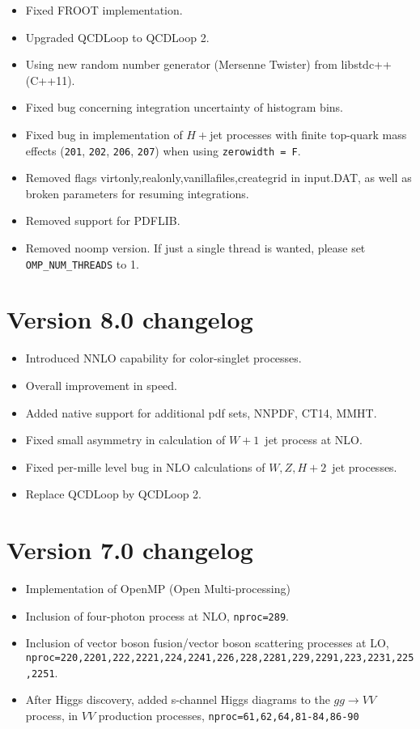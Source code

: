 \documentclass{article}
\begin{document}
{{{{{{\begin{itemize}
\item Fixed FROOT implementation.
\item Upgraded QCDLoop to QCDLoop 2.
\item Using new random number generator (Mersenne Twister) from libstdc++ (C++11).
\item Fixed bug concerning integration uncertainty of histogram bins.
\item Fixed bug in implementation of $H+$jet processes with finite top-quark mass effects
({\tt 201}, {\tt 202}, {\tt 206}, {\tt 207}) when using {\tt zerowidth = F}.

\item Removed flags virtonly,realonly,vanillafiles,creategrid in input.DAT, as well as broken
parameters for resuming integrations.
\item Removed support for PDFLIB.
\item Removed noomp version. If just a single thread is wanted, please set {\tt OMP\_NUM\_THREADS} to 1.

\end{itemize}

\section{Version 8.0 changelog}
\label{changelog8.0}
\begin{itemize}
\item Introduced NNLO capability for color-singlet processes.
\item Overall improvement in speed.
\item Added native support for additional pdf sets, NNPDF, CT14, MMHT.
\item Fixed small asymmetry in calculation of $W+1$~jet process at NLO.
\item Fixed per-mille level bug in NLO calculations of $W,Z,H+2$~jet processes.
\item Replace QCDLoop by QCDLoop 2.
\end{itemize}

\section{Version 7.0 changelog}
\label{changelog7.0}
\begin{itemize}
\item Implementation of OpenMP (Open Multi-processing)
\item Inclusion of four-photon process at NLO, {\tt nproc=289}.
\item Inclusion of vector boson fusion/vector boson scattering processes at LO,
 {\tt nproc=220,2201,222,2221,224,2241,226,228,2281,229,2291,223,2231,225,2251}.
\item After Higgs discovery, added s-channel Higgs diagrams to the $gg \to VV$ process,
in $VV$ production processes, {\tt nproc=61,62,64,81-84,86-90}
\end{itemize}

}}}}}}
\end{document}
